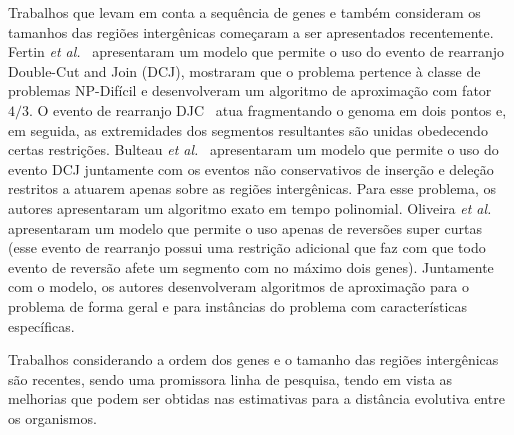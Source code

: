 Trabalhos que levam em conta a sequência de genes e também consideram os tamanhos das regiões intergênicas começaram a ser apresentados recentemente. Fertin \textit{et al.}~\cite{2017-fertin-etal} apresentaram um modelo que permite o uso do evento de rearranjo Double-Cut and Join (DCJ), mostraram que o problema pertence à classe de problemas NP-Difícil e desenvolveram um algoritmo de aproximação com fator $4/3$. O evento de rearranjo DJC~\cite{2005-yancopoulos-etal} atua fragmentando o genoma em dois pontos e, em seguida, as extremidades dos segmentos resultantes são unidas obedecendo certas restrições. Bulteau \textit{et al.}~\cite{2016b-bulteau-etal} apresentaram um modelo que permite o uso do evento DCJ juntamente com os eventos não conservativos de inserção e deleção restritos a atuarem apenas sobre as regiões intergênicas. Para esse problema, os autores apresentaram um algoritmo exato em tempo polinomial. Oliveira \textit{et al.}~\cite{2018b-oliveira-etal} apresentaram um modelo que permite o uso apenas de reversões super curtas (esse evento de rearranjo possui uma restrição adicional que faz com que todo evento de reversão afete um segmento com no máximo dois genes). Juntamente com o modelo, os autores desenvolveram algoritmos de aproximação para o problema de forma geral e para instâncias do problema com características específicas.

Trabalhos considerando a ordem dos genes e o tamanho das regiões intergênicas são recentes, sendo uma promissora linha de pesquisa, tendo em vista as melhorias que podem ser obtidas nas estimativas para a distância evolutiva entre os organismos.